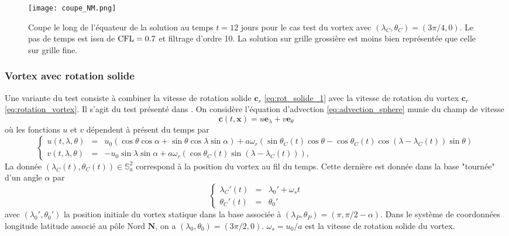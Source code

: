 \begin{figure}[htbp]
\begin{center}
\texttt{[image: coupe\_NM.png]}
\end{center}
\caption{Coupe le long de l'équateur de la solution au temps $t=12$ jours pour le cas test du vortex \cite{Nair2002} avec $(\lambda_C, \theta_C) = (3 \pi / 4,0)$. Le pas de temps est issu de $\text{CFL} = 0.7$ et filtrage d'ordre 10. La solution sur grille grossière est moins bien représentée que celle sur grille fine.}
\label{fig:coupe_NM}
\end{figure}









\subsubsection{Vortex avec rotation solide}

Une variante du test \cite{Nair2002} consiste à combiner la vitesse de rotation solide $\mathbf{c}_s$ \eqref{eq:rot_solide_1} avec la vitesse de rotation du vortex $\mathbf{c}_r$ \eqref{eq:rotation_vortex}. Il s'agit du test présenté dans \cite{Nair2008}.
On considère l'équation d'advection \eqref{eq:advection_sphere} munie du champ de vitesse
\begin{equation}
\mathbf{c}(t,\mathbf{x}) = u \mathbf{e}_{\lambda} + v \mathbf{e}_{\theta}
\end{equation}
où les fonctions $u$ et $v$ dépendent à présent du temps par 
\begin{equation}
\left\lbrace
\begin{array}{rcl}
u(t,\lambda, \theta) & = & u_0 \left( \cos \theta \cos \alpha + \sin \theta \cos \lambda \sin \alpha \right) + a \omega_r \left( \sin \theta_C(t) \cos \theta - \cos \theta_C(t) \cos (\lambda - \lambda_C(t)) \sin \theta \right) \\
v(t,\lambda, \theta) & = & - u_0 \sin \lambda \sin \alpha + a \omega_r \left( \cos \theta_C(t) \sin (\lambda - \lambda_C(t)) \right),
\end{array}
\right.
\label{eq:vitesse_NJ}
\end{equation}
La donnée $(\lambda_C(t), \theta_C(t)) \in \mathbb{S}_a^2$ correspond à la position du vortex au fil du temps. Cette dernière est donnée dans la base "tournée" d'un angle $\alpha$ par
\begin{equation}
\label{eq:vortexcenter1}
\left\lbrace
\begin{array}{rcl}
\lambda_C'(t) & = & \lambda_0' + \omega_s t \\
\theta_C'(t) & = & \theta_0'
\end{array}
\right.
\end{equation}
avec $(\lambda_0', \theta_0')$ la position initiale du vortex statique dans la base associée à $(\lambda_P, \theta_P)=(\pi, \pi/2-\alpha)$. Dans le système de coordonnées longitude latitude associé au pôle Nord $\mathbf{N}$, on a $(\lambda_0,\theta_0)=(3 \pi / 2, 0)$. $\omega_s = u_0/a$ est la vitesse de rotation solide du vortex. 

